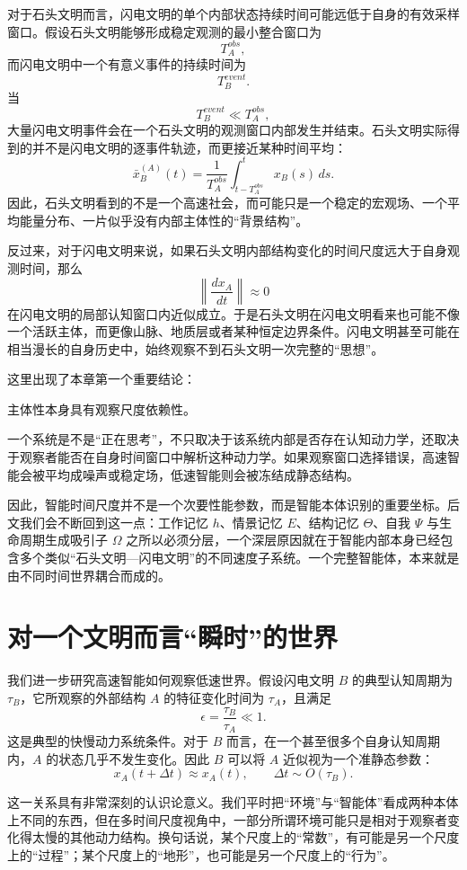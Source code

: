 对于石头文明而言，闪电文明的单个内部状态持续时间可能远低于自身的有效采样窗口。假设石头文明能够形成稳定观测的最小整合窗口为
\[
T_A^{obs},
\]
而闪电文明中一个有意义事件的持续时间为
\[
T_B^{event}.
\]
当
\[
T_B^{event}\ll T_A^{obs},
\]
大量闪电文明事件会在一个石头文明的观测窗口内部发生并结束。石头文明实际得到的并不是闪电文明的逐事件轨迹，而更接近某种时间平均：
\[
\bar{x}_B^{(A)}(t)
=
\frac{1}{T_A^{obs}}
\int_{t-T_A^{obs}}^{t}
x_B(s)\,ds.
\]
因此，石头文明看到的不是一个高速社会，而可能只是一个稳定的宏观场、一个平均能量分布、一片似乎没有内部主体性的“背景结构”。

反过来，对于闪电文明来说，如果石头文明内部结构变化的时间尺度远大于自身观测时间，那么
\[
\left\|
\frac{dx_A}{dt}
\right\|
\approx 0
\]
在闪电文明的局部认知窗口内近似成立。于是石头文明在闪电文明看来也可能不像一个活跃主体，而更像山脉、地质层或者某种恒定边界条件。闪电文明甚至可能在相当漫长的自身历史中，始终观察不到石头文明一次完整的“思想”。

这里出现了本章第一个重要结论：

\begin{conclusion}
主体性本身具有观察尺度依赖性。
\end{conclusion}

一个系统是不是“正在思考”，不只取决于该系统内部是否存在认知动力学，还取决于观察者能否在自身时间窗口中解析这种动力学。如果观察窗口选择错误，高速智能会被平均成噪声或稳定场，低速智能则会被冻结成静态结构。

因此，智能时间尺度并不是一个次要性能参数，而是智能本体识别的重要坐标。后文我们会不断回到这一点：工作记忆 $h$、情景记忆 $E$、结构记忆 $\Theta$、自我 $\Psi$ 与生命周期生成吸引子 $\Omega$ 之所以必须分层，一个深层原因就在于智能内部本身已经包含多个类似“石头文明—闪电文明”的不同速度子系统。一个完整智能体，本来就是由不同时间世界耦合而成的。


\section{对一个文明而言“瞬时”的世界}

我们进一步研究高速智能如何观察低速世界。假设闪电文明 $B$ 的典型认知周期为 $\tau_B$，它所观察的外部结构 $A$ 的特征变化时间为 $\tau_A$，且满足
\[
\epsilon=\frac{\tau_B}{\tau_A}\ll 1.
\]
这是典型的快慢动力系统条件。对于 $B$ 而言，在一个甚至很多个自身认知周期内，$A$ 的状态几乎不发生变化。因此 $B$ 可以将 $A$ 近似视为一个准静态参数：
\[
x_A(t+\Delta t)
\approx
x_A(t),
\qquad
\Delta t\sim O(\tau_B).
\]

这一关系具有非常深刻的认识论意义。我们平时把“环境”与“智能体”看成两种本体上不同的东西，但在多时间尺度视角中，一部分所谓环境可能只是相对于观察者变化得太慢的其他动力结构。换句话说，某个尺度上的“常数”，有可能是另一个尺度上的“过程”；某个尺度上的“地形”，也可能是另一个尺度上的“行为”。

